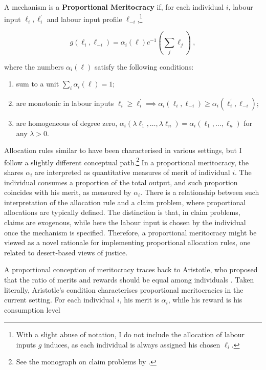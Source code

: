 \begin{definition}\label{def:prop}
	A mechanism is a \textbf{Proportional Meritocracy} if, for each individual \( i \), labour input \( \ell_i, \ell^{\prime}_{i} \) and labour input profile \( \ell_{-i} \),\footnote{With a slight abuse of notation, I do not include the allocation of labour inputs \( g \) induces, as each individual is always assigned his chosen \( \ell_i \).}

	\[ g ( \ell_i, \ell_{-i} ) = \alpha_i(\ell) c^{-1}\left(\sum_{j} \ell_j\right) \: ,\]

	where the numbers \( \alpha_i(\ell) \) satisfy the following conditions:
	\begin{enumerate}
		\item sum to a unit \( \sum_{i} \alpha_i(\ell) = 1 \);
		\item are monotonic in labour inputs \( \ell_i \geq \ell_i^{\prime} \implies \alpha_i (\ell_i, \ell_{-i} ) \geq \alpha_i (\ell_i^{\prime}, \ell_{-i} ) \);
		\item are homogeneous of degree zero, \( \alpha_i (\lambda \ell_1, \ldots, \lambda \ell_n )=\alpha_i (\ell_1, \ldots, \ell_n ) \) for any \( \lambda>0 \).
	\end{enumerate}

\end{definition}

Allocation rules similar to  have been characterised in various settings, but I follow a slightly different conceptual path.\footnote{See the monograph on claim problems by \cite{thomsonHowDivideWhen2019}.} In a proportional meritocracy, the shares \( \alpha_i \) are interpreted as quantitative measures of merit of individual \( i \). The individual consumes a proportion of the total output, and such proportion coincides with his merit, as measured by \( \alpha_i \). There is a relationship between such interpretation of the allocation rule and a claim problem, where proportional allocations are typically defined. The distinction is that, in claim problems, claims are exogenous, while here the labour input is chosen by the individual once the mechanism is specified. Therefore, a proportional meritocracy might be viewed as a novel rationale for implementing proportional allocation rules, one related to desert-based views of justice.

A proportional conception of meritocracy traces back to Aristotle, who proposed that the ratio of merits and rewards should be equal among individuals \citep{sep-meritocracy}. Taken literally, Aristotle's condition characterises proportional meritocracies in the current setting. For each individual \( i \), his merit is \( \alpha_i \), while his reward is his consumption level

